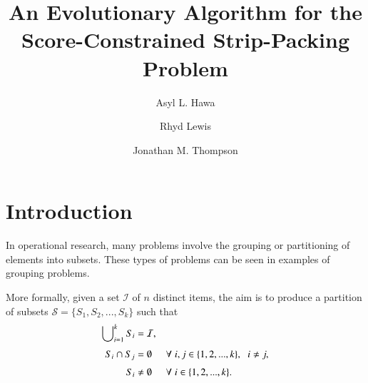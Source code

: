\documentclass{elsarticle}
\begin{document}
	
\begin{frontmatter}
\title{An Evolutionary Algorithm for the Score-Constrained Strip-Packing Problem}
\author{Asyl L. Hawa}
\author{Rhyd Lewis}
\author{Jonathan M. Thompson}
\address{School of Mathematics, Cardiff University, Senghennydd Road, Cardiff, UK}
\end{frontmatter}

\begin{comment}
1. Introduction - sec:intro
2. AHC - sec:ahc
3. Heuristics for the SCSPP - sec:scspp
3.1. Heuristics - sub:heuristics
3.2. Experimental Results - Heuristics - sub:expheuristics
4. EA - sec:ea
4.1. Crossover Operators - sub:xover
4.2. Local Search - sub:localsearch
4.3. Mutation - sub:mutation
4.4. EA Process - sub:eaframework
4.5. Experimental Results - EA - sub:expea
5. Postoptimisation - sec:postopt
5.1. Experimental Results - Postoptimisation - sub:exppostopt
6. Conclusion - sec:conclusion
\end{comment}


\section{Introduction}
\label{sec:intro}

In operational research, many problems involve the grouping or partitioning of elements into subsets. These types of problems can be seen in \alert{examples of grouping problems}.

More formally, given a set $\mathcal{I}$ of $n$ distinct items, the aim is to produce a partition of subsets $\mathcal{S} = \{S_1, S_2,...,S_k\}$ such that
\begin{subequations}
	\begin{align}
	\bigcup\nolimits_{i=1}^{k} S_i &= \mathcal{I}, \label{eqn:mgppackall}\\[3pt]
	S_i \cap S_j &= \emptyset \hspace{5mm} \forall \hspace{1mm} i, j \in \{1, 2, ...,k\}, \hspace{2mm} i \neq j, \label{eqn:mgpnooverlap} \\[3pt]
	S_i &\neq \emptyset \hspace{5mm} \forall \hspace{1mm} i\in \{1,2,...,k\}.\label{eqn:mgpallused}
	\end{align}
\end{subequations}
\end{document}
